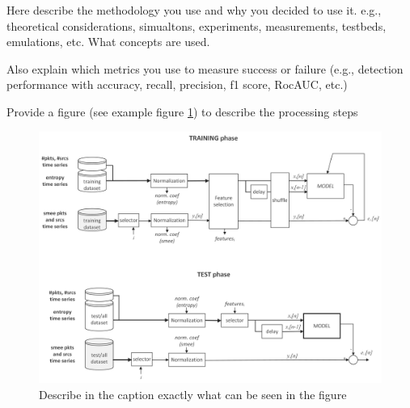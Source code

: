 Here describe the methodology you use and why you decided to use it.
e.g., theoretical considerations, simualtons, experiments, measurements, testbeds, emulations, etc. What concepts are used.

Also explain which metrics you use to measure success or failure (e.g., detection performance with accuracy, recall, precision, f1 score, RocAUC, etc.)


Provide a figure (see example figure \ref{fig:modeling-example}) to describe the processing steps

\begin{figure}[h]
	\centering
	\includegraphics[width=0.95\linewidth]{graphics/modeling-example}
	\caption{Describe in the caption exactly what can be seen in the figure}
	\label{fig:modeling-example}
\end{figure}



\newpage